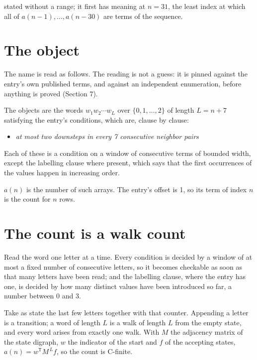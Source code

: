 \documentclass[11pt]{article}
\theoremstyle{definition}
\begin{document}
stated without a range; it first has meaning at $n = 31$, the least index at which all of $a(n-1),\dots,a(n-30)$ are terms of the sequence.

\section{The object}

The name is read as follows. The reading is not a guess: it is pinned against the entry's own published terms, and against an independent enumeration, before anything is proved (Section 7).

The objects are the words $w_1 w_2 \cdots w_L$ over $\{0,1,\dots,2\}$ of length $L = n + 7$ satisfying the entry's conditions, which are, clause by clause:

\begin{itemize}

\item {\itshape at most two downsteps in every 7 consecutive neighbor pairs}

\end{itemize}

Each of these is a condition on a window of consecutive terms of bounded width, except the labelling clause where present, which says that the first occurrences of the values happen in increasing order.

$a(n)$ is the number of such arrays. The entry's offset is 1, so its term of index $n$ is the count for $n$ rows.

\section{The count is a walk count}

Read the word one letter at a time. Every condition is decided by a window of at most a fixed number of consecutive letters, so it becomes checkable as soon as that many letters have been read; and the labelling clause, where the entry has one, is decided by how many distinct values have been introduced so far, a number between $0$ and 3.

Take as state the last few letters together with that counter. Appending a letter is a transition; a word of length $L$ is a walk of length $L$ from the empty state, and every word arises from exactly one walk. With $M$ the adjacency matrix of the state digraph, $w$ the indicator of the start and $f$ of the accepting states, $a(n) = w^{\mathsf T}M^{\,L}f$, so the count is C-finite.
\end{document}
